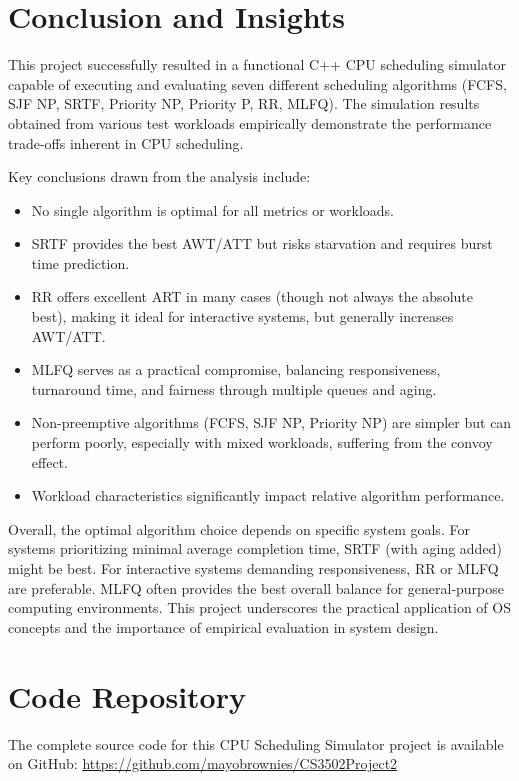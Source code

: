 \documentclass[12pt]{article}
\begin{document}
\section{Conclusion and Insights}
This project successfully resulted in a functional C++ CPU scheduling simulator capable of executing and evaluating seven different scheduling algorithms (FCFS, SJF NP, SRTF, Priority NP, Priority P, RR, MLFQ). The simulation results obtained from various test workloads empirically demonstrate the performance trade-offs inherent in CPU scheduling.

Key conclusions drawn from the analysis include:
\begin{itemize}
    \item No single algorithm is optimal for all metrics or workloads.
    \item SRTF provides the best AWT/ATT but risks starvation and requires burst time prediction.
    \item RR offers excellent ART in many cases (though not always the absolute best), making it ideal for interactive systems, but generally increases AWT/ATT.
    \item MLFQ serves as a practical compromise, balancing responsiveness, turnaround time, and fairness through multiple queues and aging.
    \item Non-preemptive algorithms (FCFS, SJF NP, Priority NP) are simpler but can perform poorly, especially with mixed workloads, suffering from the convoy effect.
    \item Workload characteristics significantly impact relative algorithm performance.
\end{itemize}

Overall, the optimal algorithm choice depends on specific system goals. For systems prioritizing minimal average completion time, SRTF (with aging added) might be best. For interactive systems demanding responsiveness, RR or MLFQ are preferable. MLFQ often provides the best overall balance for general-purpose computing environments. This project underscores the practical application of OS concepts and the importance of empirical evaluation in system design.

\section{Code Repository}
The complete source code for this CPU Scheduling Simulator project is available on GitHub:
\url{https://github.com/mayobrownies/CS3502Project2}



\end{document}
